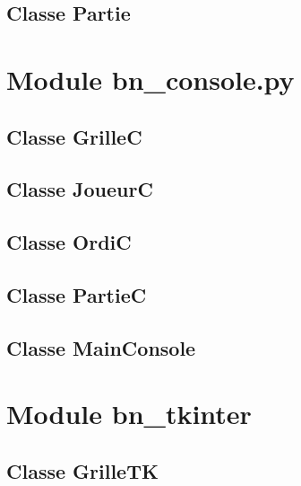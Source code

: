 \subsection{Classe Partie}


\section{Module bn\_console.py}
\subsection{Classe GrilleC}


\subsection{Classe JoueurC}


\subsection{Classe OrdiC}


\subsection{Classe PartieC}


\subsection{Classe MainConsole}


\section{Module bn\_tkinter}
\subsection{Classe GrilleTK}


